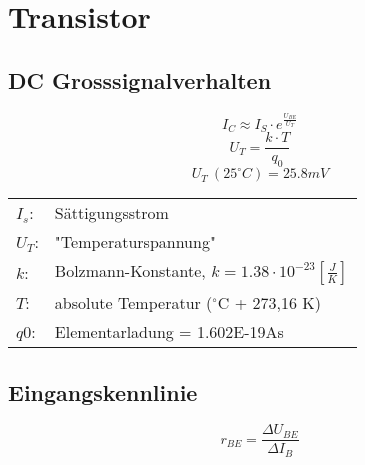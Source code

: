 



\newpage
\section{Transistor}

\subsection{DC Grosssignalverhalten}
\[ I_C \approx I_S \cdot e^{\frac{U_{BE}}{U_T}}\]
\[ U_T= \frac{k \cdot T}{q_0} \]
\[ U_T~(25^\circ C) = 25.8 mV \]
\begin{tabular}{@{}ll}
  $I_s$:        & Sättigungsstrom \\
                
  $U_T$:	    & "Temperaturspannung" \\
  $k$:          & Bolzmann-Konstante, $k=1.38 \cdot 10^{-23} [\frac{J}{K}]$ \\
  $T$:          & absolute Temperatur ($^\circ$C + 273,16 K) \\
  $q0$:         & Elementarladung = 1.602E-19As \\
                
\end{tabular}

\subsection{Eingangskennlinie}
\[ r_{BE} = \frac{\Delta U_{BE}}{\Delta I_B} \]

